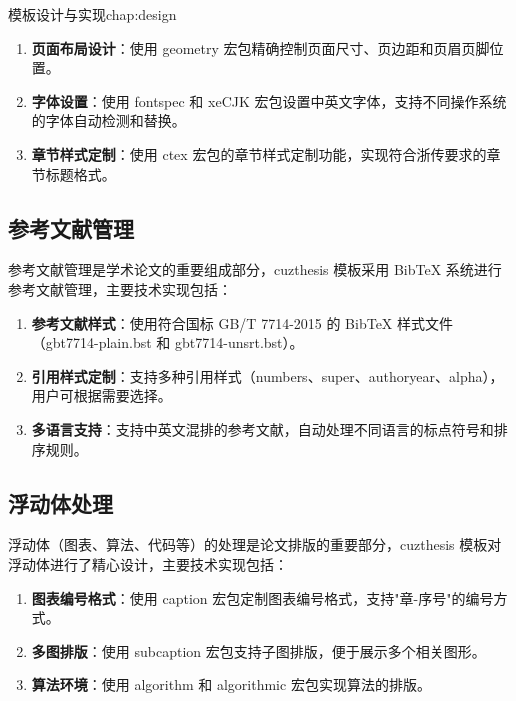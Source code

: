 \begin{cuzchapter}{模板设计与实现}{chap:design}
\begin{enumerate}
        \item \textbf{页面布局设计}：使用 geometry 宏包精确控制页面尺寸、页边距和页眉页脚位置。
        
        \item \textbf{字体设置}：使用 fontspec 和 xeCJK 宏包设置中英文字体，支持不同操作系统的字体自动检测和替换。
        
        \item \textbf{章节样式定制}：使用 ctex 宏包的章节样式定制功能，实现符合浙传要求的章节标题格式。
    \end{enumerate}
    
    \subsection{参考文献管理}
    
    参考文献管理是学术论文的重要组成部分，cuzthesis 模板采用 BibTeX 系统进行参考文献管理，主要技术实现包括：
    
    \begin{enumerate}
        \item \textbf{参考文献样式}：使用符合国标 GB/T 7714-2015 的 BibTeX 样式文件（gbt7714-plain.bst 和 gbt7714-unsrt.bst）。
        
        \item \textbf{引用样式定制}：支持多种引用样式（numbers、super、authoryear、alpha），用户可根据需要选择。
        
        \item \textbf{多语言支持}：支持中英文混排的参考文献，自动处理不同语言的标点符号和排序规则。
    \end{enumerate}
    
    \subsection{浮动体处理}
    
    浮动体（图表、算法、代码等）的处理是论文排版的重要部分，cuzthesis 模板对浮动体进行了精心设计，主要技术实现包括：
    
    \begin{enumerate}
        \item \textbf{图表编号格式}：使用 caption 宏包定制图表编号格式，支持"章-序号"的编号方式。
        
        \item \textbf{多图排版}：使用 subcaption 宏包支持子图排版，便于展示多个相关图形。
        
        \item \textbf{算法环境}：使用 algorithm 和 algorithmic 宏包实现算法的排版。
        

\end{enumerate}
\end{cuzchapter}
